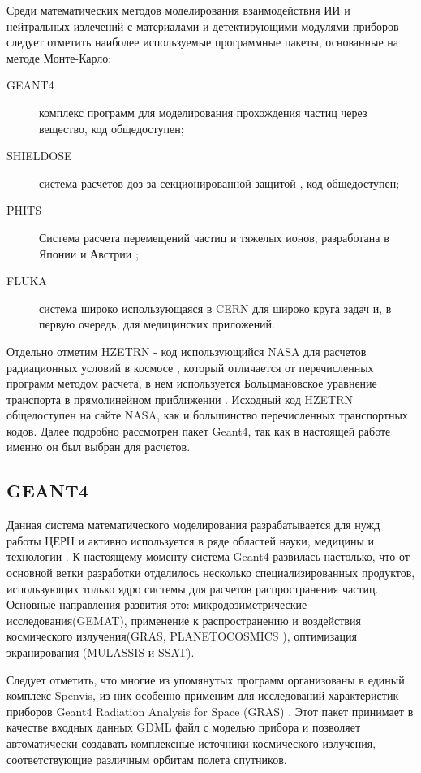 Среди математических методов моделирования взаимодействия ИИ и нейтральных излечений с материалами и детектирующими модулями приборов следует отметить наиболее используемые программные пакеты, основанные на методе Монте-Карло:


\begin{description}
	\item[GEANT4] комплекс программ для моделирования прохождения частиц через вещество\cite{Allison2006}, код общедоступен;
	\item[SHIELDOSE ] система расчетов доз за секционированной защитой \cite{SeltzerS.M.1980},  код общедоступен;
	\item[PHITS] Система расчета перемещений частиц и тяжелых ионов, 
	разработана в Японии и Австрии \cite{Niita2006, Sato2006} ;
	\item[FLUKA] система широко использующаяся в CERN для широко круга задач и, в первую очередь, для медицинских приложений\cite{Fasso2003, fluka2014}.
\end{description}

Отдельно отметим HZETRN - код использующийся NASA для расчетов радиационных условий в космосе \cite{Heinbockel2009}, который отличается от перечисленных программ методом расчета, в нем используется Больцмановское уравнение транспорта в прямолинейном приближении \cite{Wilson1995}. Исходный код HZETRN общедоступен на сайте NASA, как и большинство перечисленных транспортных кодов. Далее подробно рассмотрен  пакет Geant4, так как в настоящей работе именно он был выбран для расчетов. 


\subsection{GEANT4}

Данная система математического моделирования разрабатывается для нужд работы ЦЕРН и активно используется в ряде областей науки, медицины и технологии \cite{Agostinelli2003}. К настоящему моменту система Geant4 развилась настолько, что от основной ветки разработки отделилось несколько специализированных продуктов, использующих только ядро системы для расчетов распространения частиц. Основные направления развития это: микродозиметрические исследования(GEMAT), применение к распространению и воздействия космического излучения(GRAS, PLANETOCOSMICS ), оптимизация экранирования (MULASSIS \cite{Lei2002} и SSAT).

Следует отметить, что многие из упомянутых программ организованы в единый комплекс Spenvis, из них особенно применим для исследований характеристик приборов  Geant4 Radiation Analysis for Space (GRAS) \cite{Santin2005}. Этот пакет принимает в качестве входных данных GDML файл с моделью прибора и позволяет автоматически создавать комплексные источники космического излучения, соответствующие различным орбитам полета спутников.

